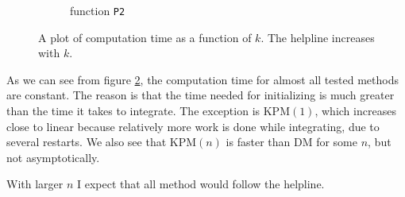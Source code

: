 \begin{figure}[H]
\begin{subfigure}[b]{0.45\textwidth}
                \caption{function \texttt{P2}}
                \label{fig:timek2}
        \end{subfigure}
        \caption{A plot of computation time as a function of $k$. The helpline increases with $k$.}\label{fig:timek}
\end{figure}
As we can see from figure \ref{fig:timek}, the computation time for almost all tested methods are constant. The reason is that the time needed for initializing is much greater than the time it takes to integrate. 
The exception is KPM$(1)$, which increases close to linear because relatively more work is done while integrating, due to several restarts. 
We also see that KPM$(n)$ is faster than DM for some $n$, but not asymptotically.

With larger $n$ I expect that all method would follow the helpline.
